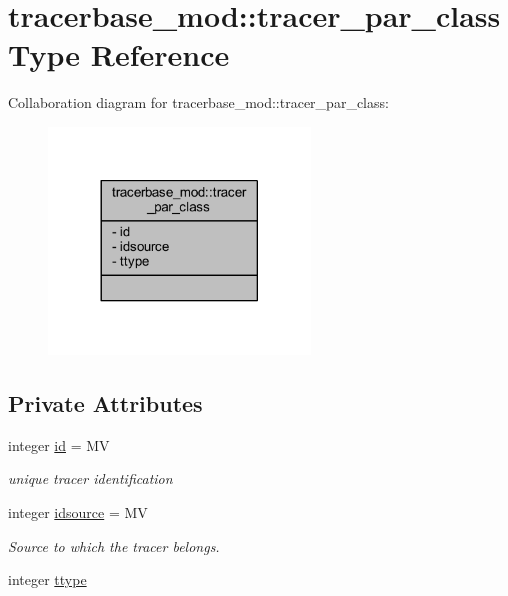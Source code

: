 \hypertarget{structtracerbase__mod_1_1tracer__par__class}{}\section{tracerbase\+\_\+mod\+:\+:tracer\+\_\+par\+\_\+class Type Reference}
\label{structtracerbase__mod_1_1tracer__par__class}


Collaboration diagram for tracerbase\+\_\+mod\+:\+:tracer\+\_\+par\+\_\+class\+:\nopagebreak
\begin{figure}[H]
\begin{center}
\leavevmode
\includegraphics[width=197pt]{structtracerbase__mod_1_1tracer__par__class__coll__graph}
\end{center}
\end{figure}
\subsection*{Private Attributes}
\begin{DoxyCompactItemize}
\item 
integer \mbox{\hyperlink{structtracerbase__mod_1_1tracer__par__class_adcbab7942d36e2c6d3cb41fc44c64347}{id}} = MV
\begin{DoxyCompactList}\small\item\em unique tracer identification \end{DoxyCompactList}\item 
integer \mbox{\hyperlink{structtracerbase__mod_1_1tracer__par__class_a3f68dcc16fb53779c2fd28cfa2b8393d}{idsource}} = MV
\begin{DoxyCompactList}\small\item\em Source to which the tracer belongs. \end{DoxyCompactList}\item 
integer \mbox{\hyperlink{structtracerbase__mod_1_1tracer__par__class_a4a5c162c0630aeda90c18e0641894dcc}{ttype}}
\end{DoxyCompactItemize}


